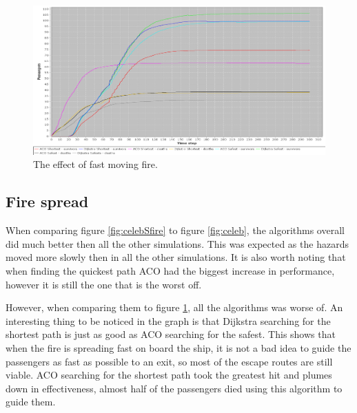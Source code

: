 \begin{figure} [h]
\centering
\hspace*{-1.0in}
\includegraphics[scale=0.35]{images/Graph-using-200-rounds-140-passangers-and-fast-fire.png}
\caption{The effect of fast moving fire.}
\label{fig:celebFfire}
\end{figure}

\subsection{Fire spread}

When comparing figure \ref{fig:celebSfire} to figure \ref{fig:celeb}, the algorithms overall did much better then all the other simulations. This was expected as the hazards moved more slowly then in all the other simulations. It is also worth noting that when finding the quickest path ACO had the biggest increase in performance, however it is still the one that is the worst off.

However, when comparing them to figure \ref{fig:celebFfire}, all the algorithms was worse of. An interesting thing to be noticed in the graph is that Dijkstra searching for the shortest path is just as good as ACO searching for the safest. This shows that when the fire is spreading fast on board the ship, it is not a bad idea to guide the passengers as fast as possible to an exit, so most of the escape routes are still viable. ACO searching for the shortest path took the greatest hit and plumes down in effectiveness, almost half of the passengers died using this algorithm to guide them.

